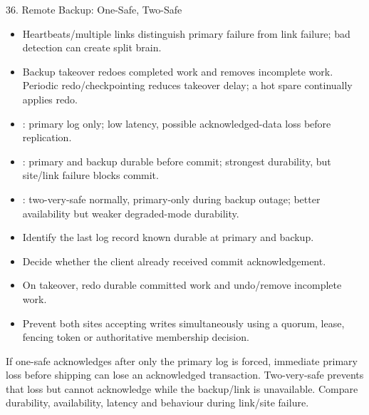 \begin{topic}{36. Remote Backup: One-Safe, Two-Safe}
\begin{itemize}
  \item Heartbeats/multiple links distinguish primary failure from link failure; bad detection can create split brain.
  \item Backup takeover redoes completed work and removes incomplete work. Periodic redo/checkpointing reduces takeover delay; a hot spare continually applies redo.
  \item {}: primary log only; low latency, possible acknowledged-data loss before replication.
  \item {}: primary and backup durable before commit; strongest durability, but site/link failure blocks commit.
  \item {}: two-very-safe normally, primary-only during backup outage; better availability but weaker degraded-mode durability.
\end{itemize}
\begin{itemize}
  \item Identify the last log record known durable at primary and backup.
  \item Decide whether the client already received commit acknowledgement.
  \item On takeover, redo durable committed work and undo/remove incomplete work.
  \item Prevent both sites accepting writes simultaneously using a quorum, lease, fencing token or authoritative membership decision.
\end{itemize}
\worked If one-safe acknowledges after only the primary log is forced, immediate primary loss before shipping can lose an acknowledged transaction. Two-very-safe prevents that loss but cannot acknowledge while the backup/link is unavailable.
\answer Compare durability, availability, latency and behaviour during link/site failure.
\end{topic}

